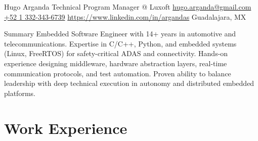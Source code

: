 \documentclass{resume} %
\begin{document}

\customheader
    {Hugo Arganda}
    {Technical Program Manager @ Luxoft}
    {\href{mailto:hugo.arganda@gmail.com}{hugo.arganda@gmail.com}}
    {\href{https://wa.me/5213323436739}{+52 1 332-343-6739}}
    {\href{https://www.linkedin.com/in/argandas}{https://www.linkedin.com/in/argandas}}
    {Guadalajara, MX}



\summary
{Summary}
    {Embedded Software Engineer with 14+ years in automotive and telecommunications. Expertise in C/C++, Python, and embedded systems (Linux, FreeRTOS) for safety-critical ADAS and connectivity. Hands-on experience designing middleware, hardware abstraction layers, real-time communication protocols, and test automation. Proven ability to balance leadership with deep technical execution in autonomy and distributed embedded platforms.}



\section{Work Experience}
\end{document}

